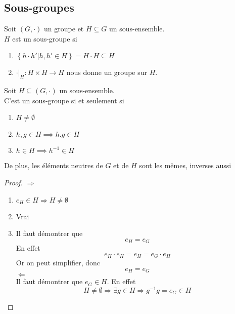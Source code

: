 \documentclass[../main.tex]{subfiles}
\begin{document}
\subsection{Sous-groupes}

\begin{defn}
	Soit $ ( G,\cdot) $ un groupe et $H\subseteq G$ un sous-ensemble.\\
	$H$ est un sous-groupe si
	\begin{enumerate}
	\item $ \left\{ h\cdot h' | h,h' \in H \right\} = H\cdot H \subseteq H $
	\item $\cdot |_H : H\times H \to H$
		nous donne un groupe sur $H$.
	\end{enumerate}
	
\end{defn}
\begin{propo}
	Soit $H\subseteq ( G,\cdot) $ un sous-ensemble.\\
	C'est un sous-groupe si et seulement si
	\begin{enumerate}
	\item $H\neq \emptyset$ 
	\item $h,g \in H \implies h.g \in H$ 
	\item $h \in H \implies h^{-1}\in H $
	\end{enumerate}
	
	De plus, les éléments neutres de $G$ et de $H$ sont les mêmes, inverses aussi
	
\end{propo}
\begin{proof}
$\Rightarrow$ \\
\begin{enumerate}
\item $e_H \in H \Rightarrow H \neq \emptyset$
\item Vrai
\item Il faut démontrer que
	\[ 
	e_H = e_G
	\]
En effet
\[ 
e_H \cdot e_H = e_H = e_G \cdot e_H
\]
Or on peut simplifier, donc
\[ 
e_H = e_G
\]
$\Leftarrow$\\
Il faut démontrer que $e_G \in H$. En effet
\[ 
	H \neq \emptyset \Rightarrow  \exists g \in H \Rightarrow g^{-1}g = e_G \in H
\]

\end{enumerate}

\end{proof}
\end{document}
